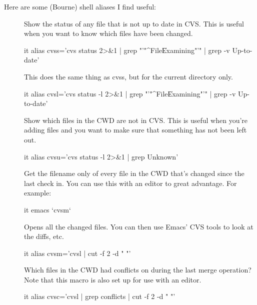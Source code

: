 \documentclass{dods-paper}
\begin{document}
Here are some (Bourne) shell aliases I find useful:
\begin{description}
\item [] Show the status of any file that is not up to date in CVS.
This is useful when you want to know which files have been changed.

\begin{vcode}{it}
alias cvss='cvs status 2>&1 | grep "'"^File\|Examining"'" | grep -v Up-to-date'
\end{vcode}

\item [] This does the same thing as cvss, but for the current
directory only.

\begin{vcode}{it}
alias cvsl='cvs status -l 2>&1 | grep "'"^File\|Examining"'" | grep -v Up-to-date'
\end{vcode}


\item [] Show which files in the CWD are not in CVS. This is useful
when you're adding files and you want to make sure that something has not
been left out.

\begin{vcode}{it}
alias cvsu='cvs status -l 2>&1 | grep Unknown'
\end{vcode}

\item [] Get the filename only of every file in the CWD that's
changed since the last check in. You can use this with an editor to great
advantage. For example:

\begin{vcode}{it}
     emacs `cvsm` 
\end{vcode}

Opens all the changed files. You can then use Emacs' CVS tools to look at the
diffs, etc.

\begin{vcode}{it}
alias cvsm='cvsl | cut -f 2 -d " "'
\end{vcode}

\item [] Which files in the CWD had conflicts on during the last
merge operation? Note that this macro is also set up for use with an editor.

\begin{vcode}{it}
alias cvsc='cvsl | grep conflicts | cut -f 2 -d " "'
\end{vcode}

\end{description}
\end{document}
